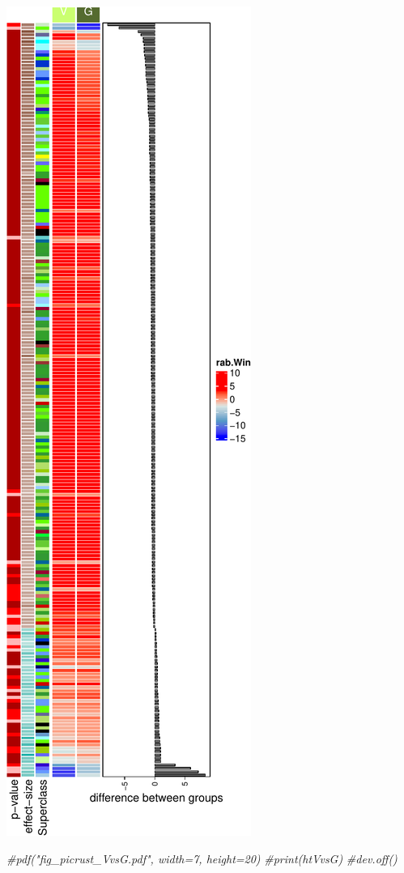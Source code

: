 \documentclass[]{interact}
\theoremstyle{plain}%
\theoremstyle{definition}
\theoremstyle{remark}
\newenvironment{Shaded}{\begin{snugshade}}{\end{snugshade}}
\newcommand{\CommentTok}[1]{\textcolor[rgb]{0.56,0.35,0.01}{\textit{#1}}}
\begin{document}
\begin{center}\includegraphics{Doc_pdf_files/figure-latex/unnamed-chunk-44-1} \end{center}

\begin{Shaded}
\begin{Highlighting}[]
\CommentTok{\#pdf("fig\_picrust\_VvsG.pdf", width=7, height=20)}
\CommentTok{\#print(htVvsG)}
\CommentTok{\#dev.off()}
\end{Highlighting}
\end{Shaded}
\end{document}
